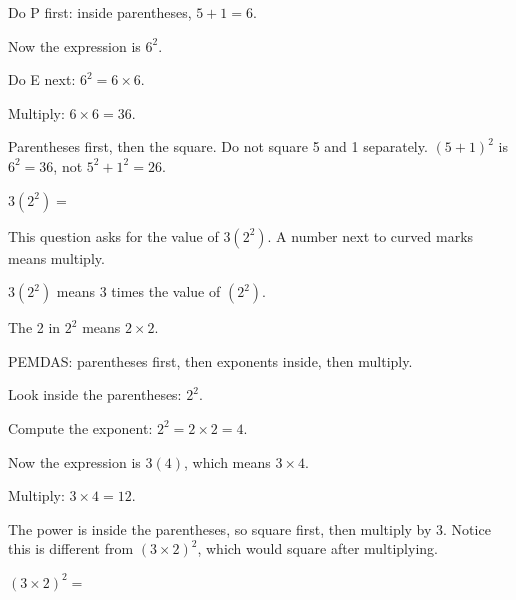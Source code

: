 \begin{steps}
  \item Do P first: inside parentheses, $5 + 1 = 6$.
  \item Now the expression is $6^{2}$.
  \item Do E next: $6^{2} = 6 \times 6$.
  \item Multiply: $6 \times 6 = 36$.
\end{steps}


Parentheses first, then the square. Do not square 5 and 1 separately.
$(5 + 1)^{2}$ is $6^{2} = 36$, not $5^{2} + 1^{2} = 26$.


$3(2^{2}) = $\ansblank


This question asks for the value of $3(2^{2})$. A number next to curved marks
means multiply.

\begin{words}
  \item $3(2^{2})$ means 3 times the value of $(2^{2})$.
  \item The 2 in $2^{2}$ means $2 \times 2$.
  \item PEMDAS: parentheses first, then exponents inside, then multiply.
\end{words}

\begin{steps}
  \item Look inside the parentheses: $2^{2}$.
  \item Compute the exponent: $2^{2} = 2 \times 2 = 4$.
  \item Now the expression is $3(4)$, which means $3 \times 4$.
  \item Multiply: $3 \times 4 = 12$.
\end{steps}


The power is inside the parentheses, so square first, then multiply by 3. Notice
this is different from $(3 \times 2)^{2}$, which would square after multiplying.


$(3 \times 2)^{2} = $\ansblank

